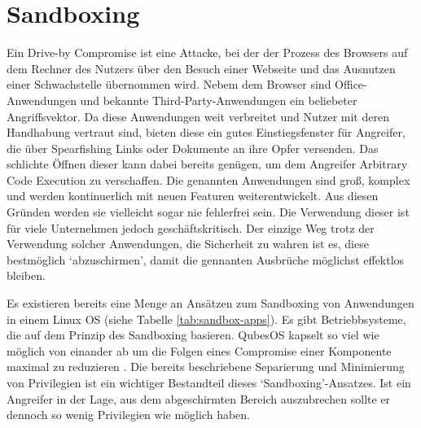 \section{Sandboxing}

Ein Drive-by Compromise ist eine Attacke, bei der der Prozess des Browsers auf dem Rechner des Nutzers über den Besuch einer Webseite und das Ausnutzen einer Schwachstelle übernommen wird. Nebem dem Browser sind Office-Anwendungen und bekannte Third-Party-Anwendungen ein beliebeter Angriffsvektor. Da diese Anwendungen weit verbreitet und Nutzer mit deren Handhabung vertraut sind, bieten diese ein gutes Einstiegsfenster für Angreifer, die über Spearfishing Links oder Dokumente an ihre Opfer
versenden. Das schlichte Öffnen dieser kann dabei bereits genügen, um dem Angreifer Arbitrary Code Execution zu verschaffen. Die genannten Anwendungen sind groß, komplex und werden kontinuerlich mit neuen Featuren weiterentwickelt. Aus diesen Gründen werden sie vielleicht sogar nie fehlerfrei sein. Die Verwendung dieser ist für viele Unternehmen jedoch geschäftskritisch. Der einzige Weg trotz der Verwendung solcher Anwendungen, die Sicherheit zu wahren ist es, diese bestmöglich
`abzuschirmen', damit die gennanten Ausbrüche möglichst effektlos bleiben.

Es existieren bereits eine Menge an Ansätzen zum Sandboxing von Anwendungen in einem Linux OS (siehe Tabelle \ref{tab:sandbox-apps}).
Es gibt Betriebbsysteme, die auf dem Prinzip des Sandboxing basieren. QubesOS kapselt so viel wie möglich von einander ab um die Folgen eines Compromise einer Komponente maximal zu reduzieren \cite{qubes}.
Die bereits beschriebene Separierung und Minimierung von Privilegien ist ein wichtiger Bestandteil dieses `Sandboxing'-Ansatzes. Ist ein Angreifer in der Lage, aus dem abgeschirmten Bereich auszubrechen sollte er dennoch so wenig Privilegien wie möglich haben.

